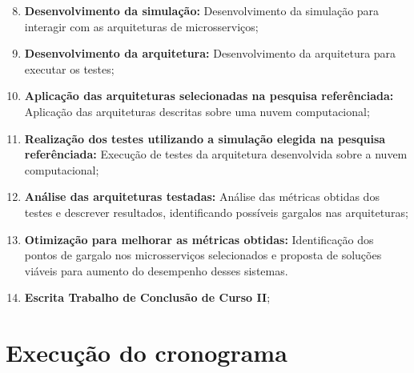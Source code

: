 \begin{enumerate}
  \setcounter{enumi}{7}
  \item \textbf{Desenvolvimento da simulação:} Desenvolvimento da simulação para interagir com as arquiteturas de microsserviços;

  \item \textbf{Desenvolvimento da arquitetura:} Desenvolvimento da arquitetura para executar os testes;

  \item \textbf{Aplicação das arquiteturas selecionadas na pesquisa referênciada:} Aplicação das arquiteturas descritas sobre uma nuvem computacional;

  \item \textbf{Realização dos testes utilizando a simulação elegida na pesquisa referênciada:} Execução de testes da arquitetura desenvolvida sobre a nuvem computacional;

  \item \textbf{Análise das arquiteturas testadas:} Análise das métricas obtidas dos testes e descrever resultados, identificando possíveis gargalos nas arquiteturas;

  \item \textbf{Otimização para melhorar as métricas obtidas:} Identificação dos pontos de gargalo nos microsserviços selecionados e proposta de soluções viáveis para aumento do desempenho desses sistemas.

  \item \textbf{Escrita Trabalho de Conclusão de Curso II};
\end{enumerate}



\section{Execução do cronograma}

